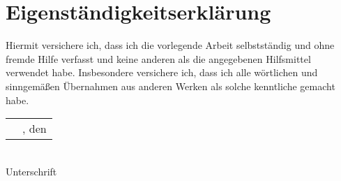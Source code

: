 \newpage


\nocite{*} %
\printbibliography %

\listoffigures %

\newpage


\section*{Eigenständigkeitserklärung} 

Hiermit versichere ich, dass ich die vorlegende Arbeit selbstständig und ohne fremde Hilfe verfasst und keine anderen als die angegebenen Hilfsmittel verwendet habe.
Insbesondere versichere ich, dass ich alle wörtlichen und sinngemäßen Übernahmen aus anderen Werken als solche kenntliche gemacht habe.

\vspace{100mm}

\begin{tabular}{@{}p{2cm}p{4cm}@{}}
    \hrulefill &, den \hrulefill \\
\end{tabular}

\begin{flushright}
\begin{minipage}[t]{8cm}
\centering \hspace{20mm} \hrulefill \\
\hspace{20mm}Unterschrift
\end{minipage}
\end{flushright}